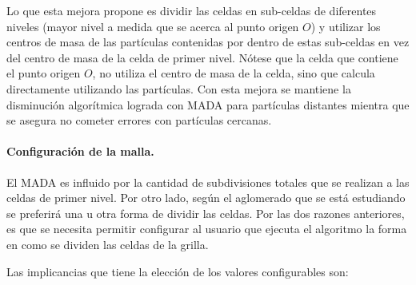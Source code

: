 \documentclass[a4paper,11pt]{book}
\begin{document}

Lo que esta mejora propone es dividir las celdas en sub-celdas de diferentes niveles (mayor nivel a medida que se acerca al punto origen $O$) y utilizar los centros de masa de las partículas contenidas por dentro de estas sub-celdas en vez del centro de masa de la celda de primer nivel. Nótese que la  celda que contiene el punto origen $O$, no utiliza el centro de masa de la celda, sino que calcula directamente utilizando las partículas.
Con esta mejora se mantiene la disminución algorítmica lograda con MADA para partículas distantes mientra que se asegura no cometer errores con partículas cercanas.

\paragraph{Configuración de la malla.}

El MADA es influido por la cantidad de subdivisiones totales que se realizan a las celdas de primer nivel. Por otro lado, según el aglomerado que se está estudiando se preferirá una u otra forma de dividir las celdas. Por las dos razones anteriores, es que se necesita permitir configurar al usuario que ejecuta el algoritmo la forma en como se dividen las celdas de la grilla.

Las implicancias que tiene la elección de los valores configurables son:
\end{document}
